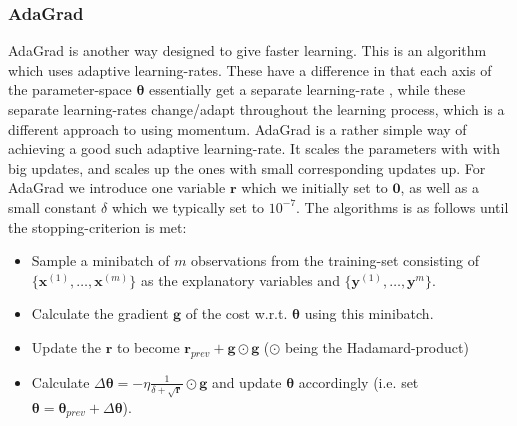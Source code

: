 \documentclass{article}
\begin{document}
\subsubsection{AdaGrad}
AdaGrad is another way designed to give faster learning. This is an algorithm
which uses adaptive learning-rates. These have a difference in that each axis of
the parameter-space $\bm{\theta}$ essentially get a separate learning-rate
\cite[s.~8.5]{goodfellow2016deep}, while these separate learning-rates change/adapt
throughout the learning process, which is a different approach to using momentum.
AdaGrad is a rather simple way of achieving a good such adaptive learning-rate.
It scales the parameters with with big updates, and scales up the ones with
small corresponding updates up. For AdaGrad we introduce one variable $\bm{r}$
which we initially set to $\bm{0}$, as well as a small constant $\delta$ which
we typically set to $10^{-7}$. The algorithms is as follows until the
stopping-criterion is met:
\begin{itemize}
      \item Sample a minibatch of $m$ observations from the training-set
            consisting of $\{\bm{x}^{(1)}, \dots, \bm{x}^{(m)}\}$ as the explanatory
            variables and $\{\bm{y}^{(1)}, \dots, \bm{y}^{m}\}$.
      \item Calculate the gradient $\bm{g}$ of the cost w.r.t. $\bm{\theta}$ using
            this minibatch.
      \item Update the $\bm{r}$ to become $\bm{r}_{prev} + \bm{g} \odot \bm{g}$
            ($\odot$ being the Hadamard-product)
      \item Calculate $\Delta \bm{\theta} = -\eta
                  \frac{1}{\delta + \sqrt{\bm{r}}} \odot \bm{g}$ and update
            $\bm{\theta}$ accordingly (i.e. set $\bm{\theta} =
                  \bm{\theta}_{prev} + \Delta \bm{\theta}$).

\end{itemize}
\end{document}
